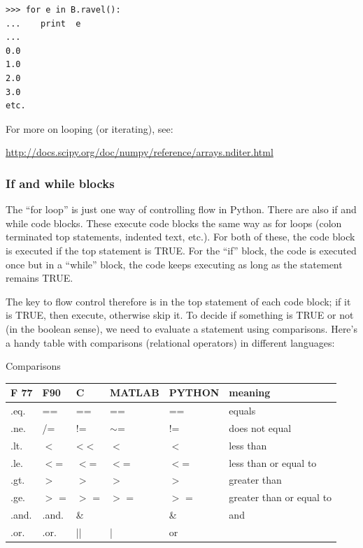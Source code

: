 \documentclass[11pt]{book}
\begin{document}
{{{ \color{blue} \begin{verbatim}
>>> for e in B.ravel():
...    print  e
...
0.0
1.0
2.0
3.0
etc.
\end{verbatim}}

For more on looping (or iterating), see:

\url{http://docs.scipy.org/doc/numpy/reference/arrays.nditer.html}



\subsubsection{If and while blocks}

The ``for loop'' is just one way of controlling flow in Python.  There are also {\color{blue}if}  and  {\color{blue}while} code blocks.  These execute code blocks  the same way as for loops (colon terminated top statements, indented text, etc.).  For both of these, the code block is executed if the top statement is  TRUE.  For the ``if'' block, the code is executed once but in a ``while'' block, the code keeps executing as long as the statement remains TRUE.

The key to flow control therefore is in the top statement of each code block;  if it is TRUE, then execute, otherwise skip it.  To decide if something is TRUE or not (in the boolean sense), we need to evaluate a statement using comparisons.   Here's a handy table with comparisons (relational operators) in different languages:

\centerline{Comparisons}
\begin{tabular}{llllll}
\hline
F 77  \qquad &   F90    \qquad &  C    \qquad & MATLAB  \qquad & PYTHON  \qquad & meaning\\
\hline
.eq.  \qquad &  ==   \qquad &   ==    \qquad &  ==  \qquad &     ==   \qquad &  equals\\
.ne. \qquad &   /=  \qquad &    !=   \qquad &   $\sim$=    \qquad &   !=  \qquad &   does not equal\\
.lt.  \qquad &  $<$   \qquad &    <$<$  \qquad &     $<$  \qquad &   $<$  \qquad &    less than\\
.le.  \qquad &  $<$= \qquad &     $<$=   \qquad &  $<$=   \qquad &    $<$=  \qquad &   less than or equal to\\
.gt.  \qquad & $>$ \qquad &      $>$    \qquad &   $>$    \qquad & $>$   \qquad &    greater than\\
.ge.  \qquad &  $>$ =   \qquad &   $>$ =   \qquad &  $>$ =  \qquad &    $>$ =  \qquad &   greater than or equal to\\
.and. \qquad & .and. \qquad &   \&\qquad &    \qquad &  \&  \qquad &      and\\
.or.  \qquad & .or.  \qquad &    ||    \qquad &  |   \qquad &     or \\
\hline
\end{tabular}


}}
\end{document}

